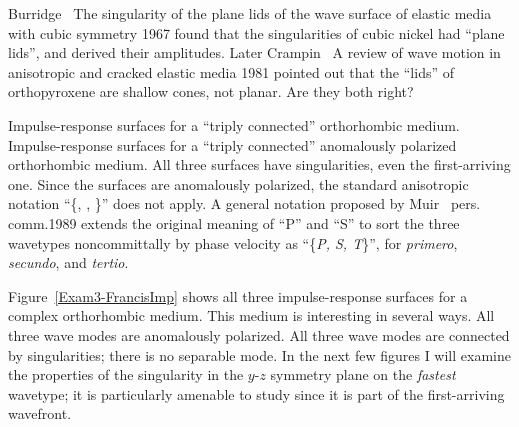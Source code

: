 Burridge~
{The singularity of the plane lids of the wave surface of elastic media with cubic symmetry}
{1967} found that the singularities of cubic nickel had ``plane lids'',
and derived their amplitudes.
Later Crampin~
{A review of wave motion in anisotropic and cracked elastic media}
{1981} pointed out that the ``lids'' of orthopyroxene are shallow cones,
not planar.
Are they both right?

{Impulse-response surfaces for a ``triply connected'' orthorhombic medium.}
{
Impulse-response surfaces for a ``triply connected'' anomalously polarized
orthorhombic medium. All three surfaces have singularities,
even the first-arriving one.
Since the surfaces are anomalously polarized, the standard anisotropic
notation ``\{{\qP}, {}, {}\}'' does not apply.
A general notation proposed by Muir~
{pers. comm.}{1989}
extends the original
meaning of ``P'' and ``S'' to sort
the three wavetypes noncommittally by phase velocity as
``\{{\sl P, S, T}\}'', for {\it primero}, {\it secundo}, and {\it tertio}.
}

Figure~\ref{Exam3-FrancisImp} shows all three impulse-response surfaces for
a complex orthorhombic medium.
This medium is interesting in several ways.
All three wave modes are anomalously polarized.
All three wave modes are connected by singularities;
there is no separable {\qP} mode.
In the next few figures I will examine the properties of
the singularity in the $y$-$z$ symmetry plane
on the {\em fastest\/} wavetype; it is particularly amenable
to study since it is part of the first-arriving wavefront.

